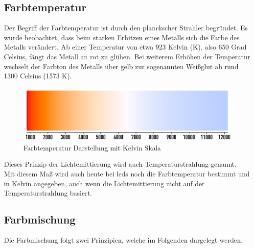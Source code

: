\documentclass[11pt]{scrartcl}
\begin{document}
\subsection{Farbtemperatur}
Der Begriff der Farbtemperatur ist durch den planckscher Strahler begründet. Es wurde beobachtet, dass beim starken Erhitzen eines Metalls
sich die Farbe des Metalls verändert. Ab einer Temperatur von etwa 923 Kelvin (K), also 650 Grad Celsius, fängt das Metall an rot zu glühen. Bei
weiterem Erhöhen der Temperatur wechselt der Farbton des Metalls über gelb zur sogenannten Weißglut ab rund 1300 Celsius (1573 K). %
\begin{figure}[H]
    \begin{center}
        \includegraphics[width=.8\textwidth]{images/thermal_radiation_figure.png}
    \end{center}
    \caption{Farbtemperatur Darstellung mit Kelvin Skala \cite{wikiFarbtemperatur}}
\end{figure}
\noindent
Dieses Prinzip der Lichtemittierung wird auch Temperaturstrahlung genannt.\\
Mit diesem Maß wird auch heute bei \ac{led}s noch die Farbtemperatur bestimmt und in Kelvin angegeben, auch wenn die Lichtemittierung nicht auf der
Temperaturstrahlung basiert.
\subsection{Farbmischung}
Die Farbmischung folgt zwei Prinzipien, welche im Folgenden dargelegt werden.
\end{document}
